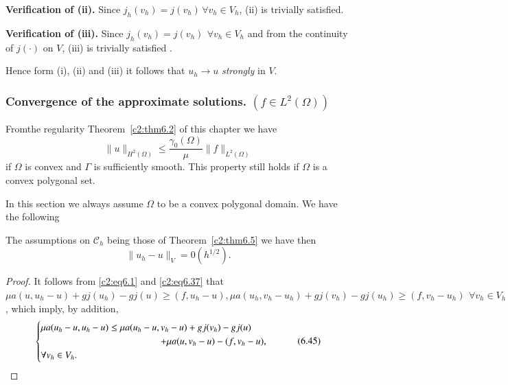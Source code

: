 \medskip
\noindent 
\textbf{Verification of (ii).}%
Since $j_h (v_h)= j(v_h)\, \forall  v_h \in V_h$, (ii) is trivially
satisfied. 

\medskip
\noindent 
\textbf{Verification of (iii).}%
Since $j_h (v_h)= j(v_h) ~\, \forall  v_h \in V_h $ and from the
continuity of $j(\cdot) $ on $V$, (iii) is trivially satisfied . 

Hence form (i), (ii) and (iii) it follows that $u_h \to u$ \textit{
  strongly } in $V$. 

\subsubsection{Convergence of the approximate solutions. $(f \in
  L^2 (\Omega))$}\label{c2:sss6.7.3} 

From\pageoriginale  the regularity Theorem~\ref{c2:thm6.2}  of this chapter we have  
\begin{equation}
\parallel  u \parallel_{H^2 (\Omega)} \leq \frac{\gamma_0 (\Omega)}{\mu} \parallel  f\parallel_{L^2
  (\Omega)} \tag{6.43}\label{c2:eq6.43}
\end{equation}
if $\Omega$ is convex and $\Gamma$ is sufficiently smooth. This
property still holds if $\Omega$ is a convex polygonal set. 

In this section we always assume $\Omega$ to be a convex polygonal
domain. We have the following  

\begin{theorem}\label{c2:thm6.6}%
The assumptions on $\mathscr{C}_h$ being those of
Theorem~\ref{c2:thm6.5} we have   then  
\begin{equation}
\parallel  u_h - u \parallel_V = 0 (h^{1/2}).\tag{6.44}\label{c2:eq6.44} 
\end{equation}
\end{theorem}

\begin{proof}
It follows from \eqref{c2:eq6.1} and \eqref{c2:eq6.37} that $\mu a (u,
u_h -u) + gj (u_h)-gj (u) \geq (f, u_h -u), \mu a (u_h, v_h -u_h) + gj
(v_h) - gj (u_h) \geq (f, v_h - u_h)~\, \forall  v_h \in V_h$, which
imply, by addition, 
\begin{equation}
\begin{cases}
\mu a (u_h - u, u_h -u) \leq \mu a (u_h - u, v_h - u) + gj (v_h)- gj
(u) \\
\hspace{4.4cm}+ \mu a (u, v_h - u) - (f, v_h -u),\\ 
\forall v_h \in V_h.
\end{cases}
\tag{6.45}\label{c2:eq6.45}
\end{equation}
\end{proof}

